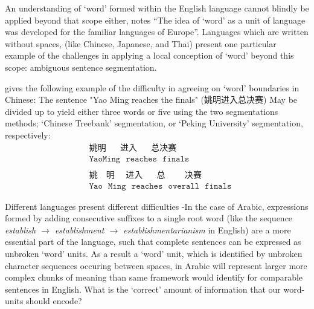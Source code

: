 An understanding of `word' formed within the English language cannot blindly be applied beyond that scope either, \textcite{dixon02-word} notes ``The idea of `word' as a unit of language was developed for the familiar languages of Europe''. Languages which are written without spaces, (like Chinese, Japanese, and Thai) present one particular example of the challenges in applying a local conception of `word' beyond this scope: ambiguous sentence segmentation. 
\begin{example}
  \textcite{chen-2017-adversarial-multi} gives the following example of the difficulty in agreeing on `word' boundaries in Chinese: The sentence "Yao Ming reaches the finals" (姚明进入总决赛) May be divided up to yield either three words or five using the two segmentations methods; `Chinese Treebank' segmentation, or `Peking University' segmentation, respectively:
  \begin{align*}
    &\texttt{姚明~~~~~进入~~~~~总决赛~}\\\tag{Chinese Treebank}
    &\texttt{YaoMing~~reaches~~finals}\\
    \\
    &\texttt{姚~~~明~~~~进入~~~~~总~~~~~~~决赛}\\\tag{Peking University}
    &\texttt{Yao~~Ming~~reaches~~overall~~finals}
  \end{align*}
\end{example}
Different languages present different difficulties -In the case of Arabic, expressions formed by adding consecutive suffixes to a single root word (like the sequence \emph{establish $\to$ establishment $\to$ establishmentarianism} in English) are a more essential part of the language, such that complete sentences can be expressed as unbroken `word' units. As a result a `word' unit, which is identified by unbroken character sequences occuring between spaces, in Arabic will represent larger more complex chunks of meaning than same framework would identify for comparable sentences in English. What is the `correct' amount of information that our word-units should encode?
